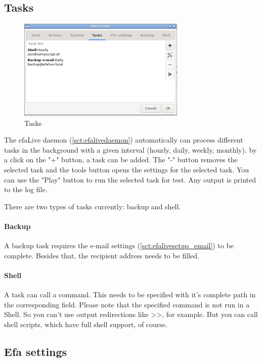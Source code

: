 \documentclass[a4paper,12pt,twoside]{article}
\begin{document}
\subsection{Tasks}
\label{sct:efalivesetup_tasks}

\begin{figure}
    \centering
    \includegraphics[width=8cm]{screenshots/efalive_setup_tasks.png}
    \caption{Tasks}
    \label{fig:efalivesetup_tasks}
\end{figure}

The efaLive daemon (\ref{sct:efalivedaemon}) automatically can process 
different tasks in the background with a given interval (hourly, daily, 
weekly, monthly). by a click on the "+" button, a task can be added. The "-" 
button removes the selected task and the tools button opens the settings 
for the selected task. You can use the "Play" button to run the selected task 
for test. Any output is printed to the log file.

There are two types of tasks currently: backup and shell.

\paragraph{Backup}
A backup task requires the e-mail settings (\ref{sct:efalivesetup_email})
to be complete. Besides that, the recipient address needs to be filled.

\paragraph{Shell}
A task can call a command. This needs to be specified with it's complete path
in the corresponding field. Please note that the specified command is not run
in a Shell. So you can't use output redirections like >>, for example. But you 
can call shell scripts, which have full shell support, of course.


\subsection{Efa settings}
\label{sct:efalivesetup_settings}
\end{document}
